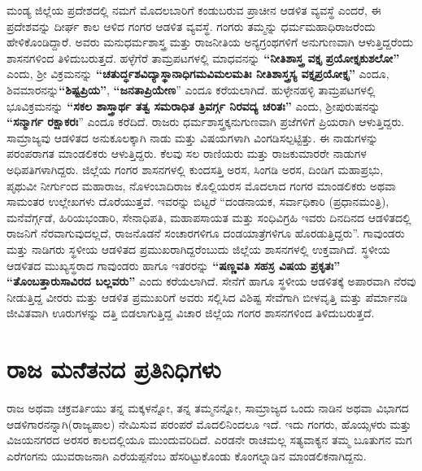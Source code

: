 ಮಂಡ್ಯ ಜಿಲ್ಲೆಯ ಪ್ರದೇಶದಲ್ಲಿ ನಮಗೆ ಮೊದಲಬಾರಿಗೆ ಕಂಡುಬರುವ ಪ್ರಾಚೀನ ಆಡಳಿತ ವ್ಯವಸ್ಥೆ ಎಂದರೆ, ಈ ಪ್ರದೇಶವನ್ನು ದೀರ್ಘ ಕಾಲ ಆಳಿದ ಗಂಗರ ಆಡಳಿತ ವ್ಯವಸ್ಥೆ. ಗಂಗರು ತಮ್ಮನ್ನು ಧರ್ಮಮಹಾಧಿರಾಜರೆಂದು ಹೇಳಿಕೊಂಡಿದ್ದಾರೆ. ಅವರು ಮನುಧರ್ಮಶಾಸ್ತ್ರ ಮತ್ತು ರಾಜನೀತಿಯ ಅನ್ಯಗ್ರಂಥಗಳಿಗೆ ಅನುಗುಣವಾಗಿ ಆಳುತ್ತಿದ್ದರೆಂದು ಶಾಸನಗಳಿಂದ ತಿಳಿದುಬರುತ್ತದೆ. ಹಳ್ಳೆಗೆರೆ ತಾಮ್ರಪಟಗಳಲ್ಲಿ ಮಾಧವನನ್ನು \textbf{“ನೀತಿಶಾಸ್ತ್ರ ವಕ್ತೃ ಪ್ರಯೋಕ್ತೃಕುಶಲೋ”} ಎಂದು, ಶ‍್ರೀ ವಿಕ್ರಮನನ್ನು \textbf{“ಚತುರ್ದ್ಧಶವಿದ್ಯಾಸ್ಥಾನಾಧಿಗಮವಿಮಲಮತಿಃ ನೀತಿಶಾಸ್ತ್ರಸ್ಯ ವಕ್ತೃಪ್ರಯೋಕ್ತೃ”} ಎಂದೂ, ಶಿವಮಾರನನ್ನು\break \textbf{“ಶಿಷ್ಟಪ್ರಿಯ”}, \textbf{“ಜನತಾಪ್ರಿಯೇಣ}” ಎಂದೂ ಕರೆಯಲಾಗಿದೆ. ಹುಳ್ಳೇನಹಳ್ಳಿ ತಾಮ್ರಪಟಗಳಲ್ಲಿ ಭೂವಿಕ್ರಮನನ್ನು \textbf{“ಸಕಲ ಶಾಸ್ತ್ರಾರ್ಥ ತತ್ವ ಸಮರಾಧಿತ ತ್ರಿವರ್ಗ್ಗ ನಿರವದ್ಯ ಚರಿತಃ”} ಎಂದು, ಶ‍್ರೀಪುರುಷನನ್ನು \textbf{“ಸನ್ಮಾರ್ಗ ರಕ್ಷಾಕರಃ}” ಎಂದೂ ಕರೆದಿದೆ. ರಾಜರು ಧರ್ಮಶಾಸ್ತ್ರಕ್ಕನುಗುಣವಾಗಿ ಪ್ರಜೆಗಳಿಗೆ ಪ್ರಿಯರಾಗಿ ಆಳುತ್ತಿದ್ದರು. ಸಾಮ್ರಾಜ್ಯವು ಆಡಳಿತದ ಅನುಕೂಲಕ್ಕಾಗಿ ನಾಡು ಮತ್ತು ವಿಷಯಗಳಾಗಿ ವಿಂಗಡಿಸಲ್ಪಟ್ಟಿತ್ತು. ಈ ನಾಡುಗಳನ್ನು ಪರಂಪರಾಗತ ಮಾಂಡಲಿಕರು ಆಳುತ್ತಿದ್ದರು. ಕೆಲವು ಸಲ ರಾಣಿಯರು ಮತ್ತು ರಾಜಕುಮಾರರೇ ನಾಡುಗಳ ಅಧಿಪತಿಗಳಾಗಿದ್ದರು. ಜಿಲ್ಲೆಯ ಗಂಗರ ಶಾಸನಗಳಲ್ಲಿ ಕುಂದಸತ್ತಿ ಅರಸ, ಸಿಂಗಡಿ ಅರಸ, ದಿಂಡಿಗ ಮಹಾಪ್ರಭು, ಪೃಥುವೀ ನೀರ್ಗುಂದ ಮಹಾರಾಜ, ನೊಳಂಬಾದಿರಾಜ ಕೊಲ್ಲಿಯರಸ ಮೊದಲಾದ ಗಂಗರ ಮಾಂಡಲಿಕರು ಅಥವಾ ಸಾಮಂತರ ಉಲ್ಲೇಖಗಳು ದೊರೆಯುತ್ತವೆ. ಇವರನ್ನು ಬಿಟ್ಟರೆ “ದಂಡನಾಯಕ, ಸರ್ವಾಧಿಕಾರಿ (ಪ್ರಧಾನಮಂತ್ರಿ), ಮನೆವೆರ್ಗ್ಗಡೆ, ಹಿರಿಯಭಂಡಾರಿ, ಸೇನಾಧಿಪತಿ, ಮಹಾಪಸಾಯತ ಮತ್ತು ಸಂಧಿವಿಗ್ರಹಿ ಇವರು ದಿನದಿನದ ಆಡಳಿತದಲ್ಲಿ ರಾಜನಿಗೆ ನೆರವಾಗುವುದಲ್ಲದೆ, ರಾಜನೊಡನೆ ಸಂಚಾರಗಳಿಗೂ ದಂಡಯಾತ್ರೆಗಳಿಗೂ ಹೊರಡುತ್ತಿದ್ದರು''. ಗಾವುಂಡರು ಮತ್ತು ನಾಡಿಗರು ಸ್ಥಳೀಯ ಆಡಳಿತದ ಪ್ರಮುಖರಾಗಿದ್ದರೆಂಬುದು ಜಿಲ್ಲೆಯ ಶಾಸನಗಳಲ್ಲಿ ಉಕ್ತವಾಗಿದೆ. ಸ್ಥಳೀಯ ಆಡಳಿತದ ಮುಖ್ಯಸ್ಥರಾದ ಗಾವುಂಡರು ಹಾಗೂ ಇತರರನ್ನು \textbf{“ಷಣ್ಣವತಿ ಸಹಸ್ರ ವಿಷಯ ಪ್ರಕೃತಃ” “ತೊಂಬತ್ತಾರುಸಾವಿರದ ಬಲ್ಲವರು”} ಎಂದು ಕರೆಯಲಾಗಿದೆ. ಸೇನೆಗೆ ಹಾಗೂ ಸ್ಥಳೀಯ ಆಡಳಿತಕ್ಕೆ ಅಪಾರವಾಗಿ ನೆರವು ನೀಡುತ್ತಿದ್ದ ವೀರರು ಮತ್ತು ಆಡಳಿತ ಪ್ರಮುಖರಿಗೆ ಅವರು ಸಲ್ಲಿಸಿದ ವಿಶಿಷ್ಟ ಸೇವೆಗಾಗಿ ಬೀಳವೃತ್ತಿ ಮತ್ತು ಪೆರ್ಮಾನಡಿ ಜೀವಿತವಾಗಿ ಊರುಗಳನ್ನು ದತ್ತಿ ಬಿಡಲಾಗುತ್ತಿದ್ದ ವಿಚಾರ ಜಿಲ್ಲೆಯ ಗಂಗರ ಶಾಸನಗಳಿಂದ ತಿಳಿದುಬರುತ್ತದೆ.

\section*{ರಾಜ ಮನೆತನದ ಪ್ರತಿನಿಧಿಗಳು}

ರಾಜ ಅಥವಾ ಚಕ್ರವರ್ತಿಯು ತನ್ನ ಮಕ್ಕಳನ್ನೋ, ತನ್ನ ತಮ್ಮನನ್ನೋ, ಸಾಮ್ರಾಜ್ಯದ ಒಂದು ನಾಡಿನ ಅಥವಾ ವಿಭಾಗದ ಆಡಳಿಗಾರನನ್ನಾಗಿ(ರಾಜ್ಯಪಾಲ) ನೇಮಿಸುವ ಪರಂಪರೆ ಮೊದಲಿನಿಂದಲೂ ಇದೆ. ಇದು ಗಂಗರು, ಹೊಯ್ಸಳರು ಮತ್ತು ವಿಜಯನಗರದ ಅರಸರ ಕಾಲದಲ್ಲಿಯೂ ಮುಂದುವರಿದಿದೆ. ಎರಡನೇ ರಾಚಮಲ್ಲ ಸತ್ಯವಾಕ್ಯನ ತಮ್ಮ ಬೂತುಗನ ಮಗ ಎರೆಗಂಗನು ಯುವರಾಜನಾಗಿ ಎರೆಯಪ್ಪನೆಂಬ ಹೆಸರಿಟ್ಟುಕೊಂಡು ಕೊಂಗಲ್ನಾಡಿನ ಮಾಂಡಲಿಕನಾಗಿದ್ದನು.

